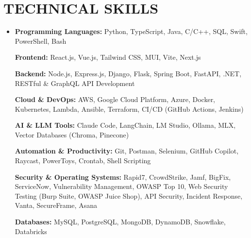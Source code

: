 \documentclass[letterpaper,10pt]{article}
\newcommand{\resumeSubHeadingListStart}{\begin{itemize}[leftmargin=0in,label={}]}
\newcommand{\resumeSubHeadingListEnd}{\end{itemize}}
\begin{document}
\section{TECHNICAL SKILLS}
\vspace{6pt}
\resumeSubHeadingListStart
\item \small{

\textbf{Programming Languages:} Python, TypeScript, Java, C/C++, SQL, Swift, PowerShell, Bash

\vspace{3pt}

\textbf{Frontend:} React.js, Vue.js, Tailwind CSS, MUI, Vite, Next.js

\vspace{3pt}

\textbf{Backend:} Node.js, Express.js, Django, Flask, Spring Boot, FastAPI, .NET, RESTful \& GraphQL API Development

\vspace{3pt}

\textbf{Cloud \& DevOps:} AWS, Google Cloud Platform, Azure, Docker, Kubernetes, Lambda, Ansible, Terraform, CI/CD (GitHub Actions, Jenkins)

\vspace{3pt}

\textbf{AI \& LLM Tools:} Claude Code, LangChain, LM Studio, Ollama, MLX, Vector Databases (Chroma, Pinecone)

\vspace{3pt}

\textbf{Automation \& Productivity:} Git, Postman, Selenium, GitHub Copilot, Raycast, PowerToys, Crontab, Shell Scripting

\vspace{3pt}

\textbf{Security \& Operating Systems:} Rapid7, CrowdStrike, Jamf, BigFix, ServiceNow, Vulnerability Management, OWASP Top 10, Web Security Testing (Burp Suite, OWASP Juice Shop), API Security, Incident Response, Vanta, SecureFrame, Asana

\vspace{3pt}

\textbf{Databases:} MySQL, PostgreSQL, MongoDB, DynamoDB, Snowflake, Databricks

}
\resumeSubHeadingListEnd
\end{document}
